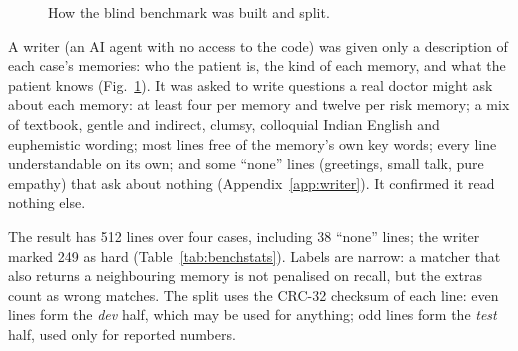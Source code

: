 \documentclass[sn-mathphys-num]{sn-jnl}
\begin{document}
\begin{figure}[t]
\centering
{}
\caption{How the blind benchmark was built and split.}
\label{fig:bench}
\end{figure}

A writer (an AI agent with no access to the code) was given only a description of each case's memories: who the patient is, the kind of each
memory, and what the patient knows (Fig.~\ref{fig:bench}). It was asked to write questions a real doctor might ask about each memory: at least four
per memory and twelve per risk memory; a mix of textbook, gentle and indirect, clumsy, colloquial Indian English and euphemistic wording; most
lines free of the memory's own key words; every line understandable on its own; and some ``none'' lines (greetings, small talk, pure empathy)
that ask about nothing (Appendix~\ref{app:writer}). It confirmed it read nothing else.

The result has 512 lines over four cases, including 38 ``none'' lines; the writer marked 249 as hard (Table~\ref{tab:benchstats}). Labels are
narrow: a matcher that also returns a neighbouring memory is not penalised on recall, but the extras count as wrong matches. The split uses the
CRC-32 checksum of each line: even lines form the \emph{dev} half, which may be used for anything; odd lines form the \emph{test} half, used only
for reported numbers.
\end{document}
